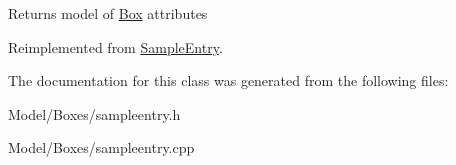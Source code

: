 \begin{DoxyReturn}{Returns}
model of \hyperlink{class_box}{Box} attributes 
\end{DoxyReturn}


Reimplemented from \hyperlink{class_sample_entry_a0babc6ec796f6bf05a5e3e59d635ca79}{Sample\-Entry}.



The documentation for this class was generated from the following files\-:\begin{DoxyCompactItemize}
\item 
Model/\-Boxes/sampleentry.\-h\item 
Model/\-Boxes/sampleentry.\-cpp\end{DoxyCompactItemize}
